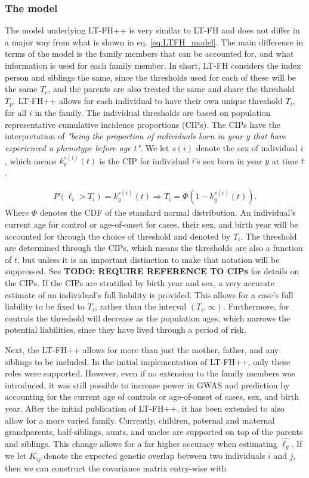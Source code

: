 \subsubsection{The model}

The model underlying LT-FH++ is very similar to LT-FH and does not differ in a major way from what is shown in eq. \ref{eq:LTFH_model}. The main difference in terms of the model is the family members that can be accounted for, and what information is used for each family member. In short, LT-FH considers the index person and siblings the same, since the thresholds used for each of these will be the same $ T_c $, and the parents are also treated the same and share the threshold $ T_p $. LT-FH++ allows for each individual to have their own unique threshold $ T_i $, for all $ i $ in the family. The individual thresholds are based on population representative cumulative incidence proportions (CIPs). The CIPs have the interpretation of \textit{"being the proportion of individuals born in year $ y $ that have experienced a phenotype before age $ t $"}. We let $ s(i) $ denote the sex of individual $ i $, which means $ k_{y}^{s(i)}(t) $ is the CIP for individual $ i $'s sex born in year $ y $ at time $ t $.

\begin{align*}
P\left( \ell_i > T_i \right) = k_{y}^{s(i)}(t) \Rightarrow T_i = \Phi \left(1 - k_{y}^{s(i)}(t) \right).
\end{align*}
Where $ \Phi $ denotes the CDF of the standard normal distribution. An individual's current age for control or age-of-onset for cases, their sex, and birth year will be accounted for through the choice of threshold and denoted by $ T_i $. The threshold are determined through the CIPs, which means the thresholds are also a function of $ t $, but unless it is an important distinction to make that notation will be suppressed. See \textbf{TODO: REQUIRE REFERENCE TO CIPs} for details on the CIPs. If the CIPs are stratified by birth year and sex, a very accurate estimate of an individual's full liability is provided. This allows for a case's full liability to be fixed to $ T_i $, rather than the interval $ (T_i, \infty) $. Furthermore, for controls the threshold will decrease as the population ages, which narrows the potential liabilities, since they have lived through a period of risk.

Next, the LT-FH++ allows for more than just the mother, father, and any siblings to be included. In the initial implementation of LT-FH++, only these roles were supported. However, even if no extension to the family members was introduced, it was still possible to increase power in GWAS and prediction by accounting for the current age of controls or age-of-onset of cases, sex, and birth year. After the initial publication of LT-FH++, it has been extended to also allow for a more varied family. Currently, children, paternal and maternal grandparents, half-siblings, aunts, and uncles are supported on top of the parents and siblings. This change allows for a far higher accuracy when estimating $ \hat{\ell_g} $. If we let $ K_{ij} $ denote the expected genetic overlap between two individuals $ i $ and $ j $, then we can construct the covariance matrix entry-wise with 

